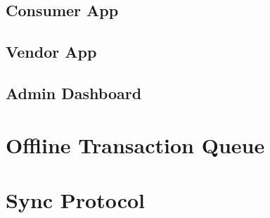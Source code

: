 \subsection{Consumer App}
\label{subsec:consumer-app}

\subsection{Vendor App}
\label{subsec:vendor-app}

\subsection{Admin Dashboard}
\label{subsec:admin-dashboard}

\section{Offline Transaction Queue}
\label{sec:offline-queue}

\section{Sync Protocol}
\label{sec:sync-protocol}
